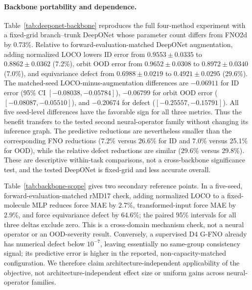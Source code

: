 \paragraph{Backbone portability and dependence.}
Table~\ref{tab:deeponet-backbone} reproduces the full four-method experiment with
a fixed-grid branch--trunk DeepONet whose parameter count differs from FNO2d by
0.73\%.  Relative to forward-evaluation-matched DeepONet augmentation, adding
normalized LOCO lowers ID error from \(0.9553\pm0.0335\) to
\(0.8862\pm0.0362\) (7.2\%), orbit OOD error from \(0.9652\pm0.0308\) to
\(0.8972\pm0.0340\) (7.0\%), and equivariance defect from
\(0.6988\pm0.0219\) to \(0.4921\pm0.0295\) (29.6\%).  The matched-seed
LOCO-minus-augmentation differences are \(-0.06911\) for ID error (95\% CI
\([-0.08038,-0.05784]\)), \(-0.06799\) for orbit OOD error
(\([-0.08087,-0.05510]\)), and \(-0.20674\) for defect
(\([-0.25557,-0.15791]\)).  All five seed-level differences have the favorable
sign for all three metrics.  Thus the benefit transfers to the tested second
neural-operator family without changing its inference graph.  The predictive
reductions are nevertheless smaller than the corresponding FNO reductions
(7.2\% versus 26.6\% for ID and 7.0\% versus 25.1\% for OOD), while the relative
defect reductions are similar (29.6\% versus 29.8\%).  These are descriptive
within-task comparisons, not a cross-backbone significance test, and the tested
DeepONet is fixed-grid and less accurate overall.

Table~\ref{tab:backbone-scope} gives two secondary reference points.  In a
five-seed, forward-evaluation-matched rMD17 check, adding normalized LOCO to a
fixed-molecule MLP reduces force MAE by 2.7\%, transformed-input force MAE by
2.9\%, and force equivariance defect by 64.6\%; the paired 95\% intervals for all
three deltas exclude zero.  This is a cross-domain mechanism check, not a neural
operator or an OOD-severity result.  Conversely, a supervised D4 G-FNO already
has numerical defect below \(10^{-7}\), leaving essentially no same-group
consistency signal; its predictive error is higher in the reported,
non-capacity-matched configuration.  We therefore claim architecture-independent
applicability of the objective, not architecture-independent effect size or
uniform gains across neural-operator families.

